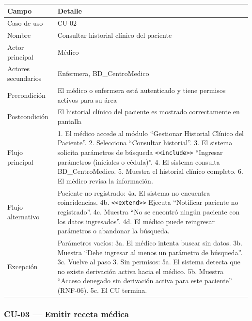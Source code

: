 \documentclass[11pt,a4paper]{article}
\begin{document}
	\begin{longtable}{p{} p{} }
		
		
		\toprule
		\textbf{Campo} &
		\textbf{Detalle}  \\
		\midrule
		\endhead
		
		Caso de uso & CU-02 \\
		Nombre & Consultar historial clínico del paciente \\
		Actor principal & Médico \\
		Actores secundarios & Enfermera, BD\_CentroMedico \\
		Precondición & El médico o enfermera está autenticado y tiene permisos activos para su área \\
		Postcondición & El historial clínico del paciente es mostrado correctamente en pantalla \\
		Flujo principal & 1. El médico accede al módulo ``Gestionar Historial Clínico del Paciente''. 2. Selecciona ``Consultar historial''. 3. El sistema solicita parámetros de búsqueda \texttt{<<include>>} ``Ingresar parámetros (iniciales o cédula)''. 4. El sistema consulta BD\_CentroMedico. 5. Muestra el historial clínico completo. 6. El médico revisa la información. \\
		Flujo alternativo & Paciente no registrado: 4a. El sistema no encuentra coincidencias. 4b. \texttt{<<extend>>} Ejecuta ``Notificar paciente no registrado''. 4c. Muestra ``No se encontró ningún paciente con los datos ingresados''. 4d. El médico puede reingresar parámetros o abandonar la búsqueda. \\
		Excepción & Parámetros vacíos: 3a. El médico intenta buscar sin datos. 3b. Muestra ``Debe ingresar al menos un parámetro de búsqueda''. 3c. Vuelve al paso 3. Sin permisos: 5a. El sistema detecta que no existe derivación activa hacia el médico. 5b. Muestra ``Acceso denegado sin derivación activa para este paciente'' (RNF-06). 5c. El CU termina. \\
		
		\bottomrule
	\end{longtable}
	
	\subsubsection{CU-03 --- Emitir receta médica}
	
\end{document}
